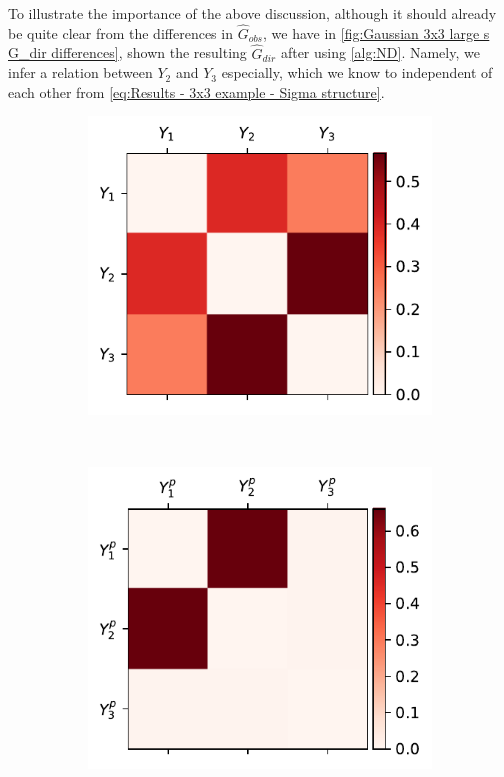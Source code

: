 \documentclass[../Thesis.tex]{subfiles}
\begin{document}
To illustrate the importance of the above discussion, although it should already be quite clear from the differences in $\hat{G}_{obs}$, we have in \autoref{fig:Gaussian 3x3 large s G_dir differences}, shown the resulting $\hat{G}_{dir}$ after using \autoref{alg:ND}. Namely, we infer a relation between $Y_2$ and $Y_3$ especially, which we know to independent of each other from \autoref{eq:Results - 3x3 example - Sigma structure}.
\begin{figure}[H]
    \centering
    \begin{subfigure}[t]{0.49\textwidth}
        \centering
        \includegraphics[width=\linewidth]{figures/ND examples/Gaussian 3x3 large s.pdf}
        \caption{}
        \label{fig:Gaussian 3x3 large s}
    \end{subfigure}%
    ~
    \begin{subfigure}[t]{0.49\textwidth}
        \centering
        \includegraphics[width=\linewidth]{figures/ND examples/Gaussian 3x3 large s power.pdf}

\end{subfigure}
\end{figure}
\end{document}
